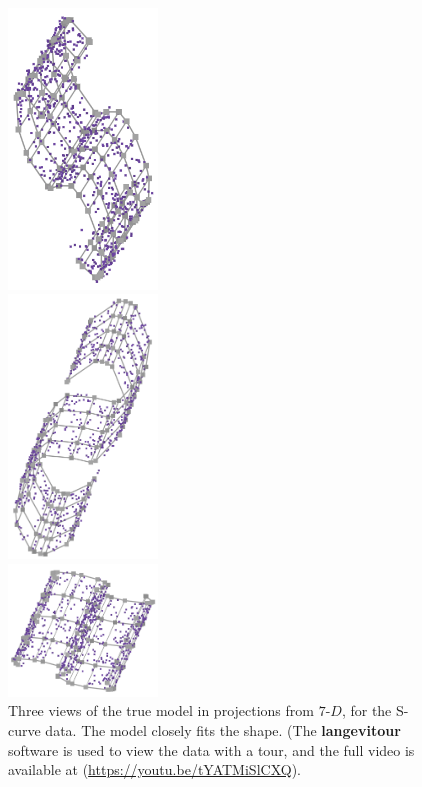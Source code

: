 \documentclass[
  12pt]{article}
\begin{document}
\begin{figure}[H]

\begin{minipage}{0.33\linewidth}
\begin{center}
\includegraphics[width=1.5625in,height=\textheight]{figures/scurve/sc_true_1.png}
\end{center}
\end{minipage}%
%
\begin{minipage}{0.33\linewidth}
\begin{center}
\includegraphics[width=1.5625in,height=\textheight]{figures/scurve/sc_true_2.png}
\end{center}
\end{minipage}%
%
\begin{minipage}{0.33\linewidth}
\begin{center}
\includegraphics[width=1.5625in,height=\textheight]{figures/scurve/sc_true_3.png}
\end{center}
\end{minipage}%

\caption{\label{fig-scurve-true-sc}Three views of the true model in
projections from \(7\text{-}D\), for the S-curve data. The model closely
fits the shape. (The \textbf{langevitour} software is used to view the
data with a tour, and the full video is available at
(\url{https://youtu.be/tYATMiSlCXQ}).}

\end{figure}%
\end{document}
